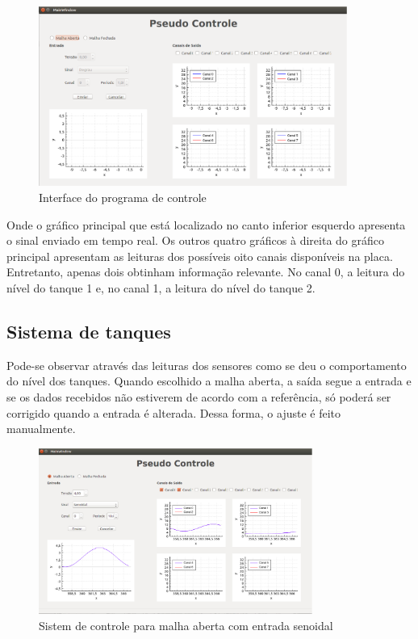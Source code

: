 \documentclass[a4paper,12pt]{article}
\begin{document}
\begin{figure}[!h]
\centering
\includegraphics[width=0.9\textwidth]{prog-geral.eps}
\caption{Interface do programa de controle}
\label{Rotulo}
\end{figure}
\hspace{4ex}
Onde o gráfico principal que está localizado no canto inferior esquerdo apresenta o sinal enviado em tempo real. Os outros quatro gráficos à direita do gráfico principal apresentam as leituras dos possíveis oito canais disponíveis na placa. Entretanto, apenas dois obtinham informação relevante. No canal 0, a leitura do nível do tanque 1 e, no canal 1, a leitura do nível do tanque 2.



\newpage
\subsection{Sistema de tanques}
\hspace{4ex}
Pode-se observar através das leituras dos sensores como se deu o comportamento do nível dos tanques. Quando escolhido a malha aberta, a saída segue a entrada e se os dados recebidos não estiverem de acordo com a referência, só poderá ser corrigido quando a entrada é alterada. Dessa forma, o ajuste é feito manualmente. 

\begin{figure}[!h]
\centering
\includegraphics[width=0.8\textwidth]{maberta-sen-4.eps}
\caption{Sistem de controle para malha aberta com entrada senoidal}
\label{Entrada Senoidal - aberta}
\end{figure}
  
\end{document}
